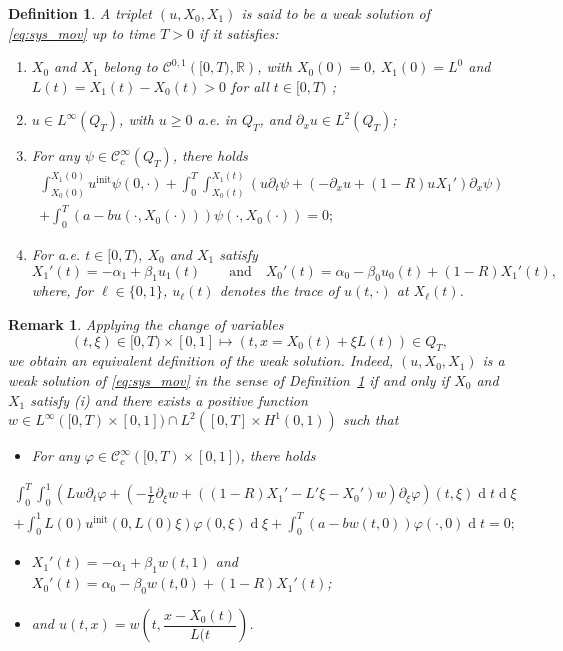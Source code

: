 \documentclass{amsart}
\newcommand\dd{{\operatorname{d}}}
\newcommand\R{\mathbb{R}}
\renewcommand\d[1]{\partial_{#1}}
\newtheorem{remark}[theorem]{Remark}
\newtheorem{definition}{Definition}
\begin{document}
		\begin{definition} \label{def:weak}
			A triplet $(u,X_0,X_1)$ is said to be a \emph{weak solution} of \eqref{eq:sys_mov} up to time $T > 0$ if it satisfies:
	\begin{enumerate}[label=(\textit{\roman*})]
		\item $X_0$ and $X_1$ belong to $\mathcal{C}^{0,1} \left( [0,T), \R \right)$, with $X_0(0) = 0$, $X_1(0)= L^0$ and $L(t)=X_1(t)-X_0(t)>0$ for all $t\in [0,T)$ ;
		\item $u \in L^{\infty}(Q_T)$, with $u \geq 0$ a.e. in $Q_T$, and $\d{x}u \in L^2(Q_T)$;
		\item For any $\psi \in \mathcal{C}^\infty_c (Q_T)$, there holds
			\begin{multline}\label{eq:weak}
				\int_{X_0(0)}^{X_1(0)} u^\text{init}\psi(0,\cdot) + \int_0^T \int_{X_0(t)}^{X_1(t)} (u \d{t} \psi + (- \d{x}u + (1-R)uX_1') \d{x} \psi)\\ + \int_0^T \left(a - bu(\cdot, X_0(\cdot))\right) \psi(\cdot,X_0(\cdot)) = 0;
			\end{multline}
		\item For a.e. $t \in [0,T)$, $X_0$ and $X_1$ satisfy
		\[
		X_1'(t) = - \alpha_1 + \beta_1 u_1(t) \qquad \text{and} \quad 
		X_0'(t) = \alpha_0 - \beta_0 u_0(t) + (1-R) X_1'(t),
		\]
			where, for $\ell \in \{0,1\}$, $u_\ell(t)$ denotes the trace of $u(t, \cdot)$ at $X_\ell(t)$.
	\end{enumerate}				
		\end{definition}

\begin{remark}\label{rk:def-weak-sol}
Applying the change of variables 
$$
(t,\xi)\in [0,T)\times [0,1]\mapsto (t,x=X_0(t)+\xi L(t))\in Q_T,
$$
we obtain an equivalent definition of the weak solution. Indeed, $(u,X_0,X_1)$ is a weak solution of \eqref{eq:sys_mov} in the sense of Definition~\ref{def:weak} if and only if  $X_0$ and $X_1$ satisfy {\em (i)} and there exists  a positive function $w\in L^{\infty} ([0,T)\times [0,1])\cap L^2([0,T]\times H^1(0,1))$ such that
 \begin{itemize}
 \item For any $\varphi\in \mathcal{C}^\infty_c ([0,T)\times [0,1])$, there holds
 \end{itemize}
  \begin{multline}\label{eq:weak-w}
				\int_0^T \int_{0}^{1} \left(Lw \d{t} \varphi + \left(- \frac{1}{L}\d{\xi}w+ ((1-R)X_1'-L' \xi-X_0')w\right) \d{\xi} \varphi\right)(t,\xi) \dd t\dd \xi\\
				+\int_{0}^{1} L(0)u^\text{init}(0,L(0)\xi)\varphi(0,\xi)\dd \xi + \int_0^T \left(a - bw(t, 0)\right) \varphi(\cdot,0)\dd t = 0;
			\end{multline}
\begin{itemize}
\item  $X_1'(t)=-\alpha_1+\beta_1 w(t,1)$ and $X_0'(t)=\alpha_0-\beta_0 w(t,0) +(1-R) X_1'(t)$;
\item and $u(t,x)= w(t,\dfrac{x-X_0(t)}{L(t})$.
\end{itemize}

\end{remark}
\end{document}
